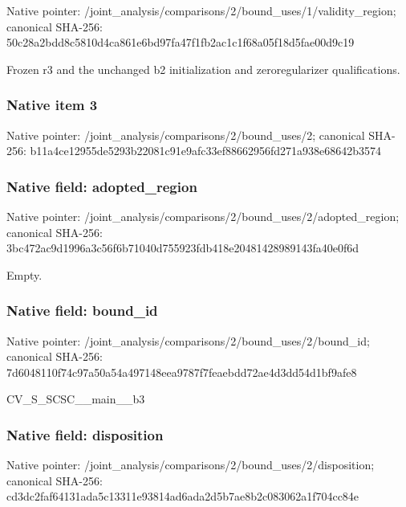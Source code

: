 \documentclass[10pt,a4paper]{article}
\begin{document}
Native pointer: /joint\_analysis/comparis\allowbreak{}ons/2/bound\_uses/1/valid\allowbreak{}ity\_region; canonical SHA-256: 50c28a2bdd8c5810d4ca861e\allowbreak{}6bd97fa47f1fb2ac1c1f68a0\allowbreak{}5f18d5fae00d9c19


Frozen r3 and the unchanged b2 initialization and zeroregularizer qualifications.


\subsubsection{Native item 3}


Native pointer: /joint\_analysis/comparis\allowbreak{}ons/2/bound\_uses/2; canonical SHA-256: b11a4ce12955de5293b22081\allowbreak{}c91e9afc33ef88662956fd27\allowbreak{}1a938e68642b3574



\subsubsection{Native field: adopted\_region}


Native pointer: /joint\_analysis/comparis\allowbreak{}ons/2/bound\_uses/2/adopt\allowbreak{}ed\_region; canonical SHA-256: 3bc472ac9d1996a3c56f6b71\allowbreak{}040d755923fdb418e2048142\allowbreak{}8989143fa40e0f6d


Empty.


\subsubsection{Native field: bound\_id}


Native pointer: /joint\_analysis/comparis\allowbreak{}ons/2/bound\_uses/2/bound\allowbreak{}\_id; canonical SHA-256: 7d6048110f74c97a50a54a49\allowbreak{}7148eea9787f7feaebdd72ae\allowbreak{}4d3dd54d1bf9afe8


CV\_S\_SCSC\_\_main\_\_b3


\subsubsection{Native field: disposition}


Native pointer: /joint\_analysis/comparis\allowbreak{}ons/2/bound\_uses/2/dispo\allowbreak{}sition; canonical SHA-256: cd3dc2faf64131ada5c13311\allowbreak{}e93814ad6ada2d5b7ae8b2c0\allowbreak{}83062a1f704cc84e
\end{document}
